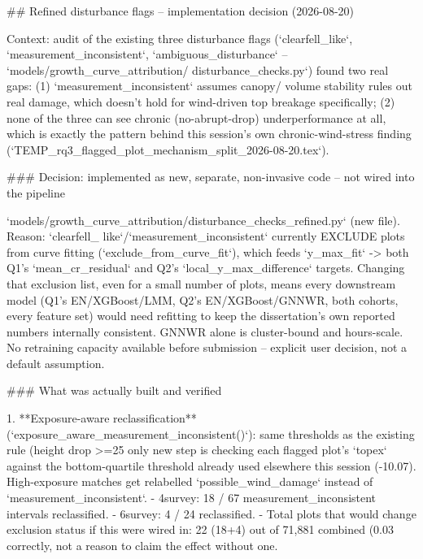 ## Refined disturbance flags -- implementation decision (2026-08-20)

Context: audit of the existing three disturbance flags (`clearfell_like`,
`measurement_inconsistent`, `ambiguous_disturbance` -- `models/growth_curve_attribution/
disturbance_checks.py`) found two real gaps: (1) `measurement_inconsistent` assumes canopy/
volume stability rules out real damage, which doesn't hold for wind-driven top breakage
specifically; (2) none of the three can see chronic (no-abrupt-drop) underperformance at all,
which is exactly the pattern behind this session's own chronic-wind-stress finding
(`TEMP_rq3_flagged_plot_mechanism_split_2026-08-20.tex`).

### Decision: implemented as new, separate, non-invasive code -- not wired into the pipeline

`models/growth_curve_attribution/disturbance_checks_refined.py` (new file). Reason: `clearfell_
like`/`measurement_inconsistent` currently EXCLUDE plots from curve fitting
(`exclude_from_curve_fit`), which feeds `y_max_fit` -> both Q1's `mean_cr_residual` and Q2's
`local_y_max_difference` targets. Changing that exclusion list, even for a small number of
plots, means every downstream model (Q1's EN/XGBoost/LMM, Q2's EN/XGBoost/GNNWR, both cohorts,
every feature set) would need refitting to keep the dissertation's own reported numbers
internally consistent. GNNWR alone is cluster-bound and hours-scale. No retraining capacity
available before submission -- explicit user decision, not a default assumption.

### What was actually built and verified

1. **Exposure-aware reclassification** (`exposure_aware_measurement_inconsistent()`): same
   thresholds as the existing rule (height drop >=25%
   only new step is checking each flagged plot's `topex` against the bottom-quartile threshold
   already used elsewhere this session (-10.07). High-exposure matches get relabelled
   `possible_wind_damage` instead of `measurement_inconsistent`.
   - 4survey: 18 / 67 measurement_inconsistent intervals reclassified.
   - 6survey: 4 / 24 reclassified.
   - Total plots that would change exclusion status if this were wired in: 22 (18+4) out of
     71,881 combined (0.03%
     correctly, not a reason to claim the effect without one.


